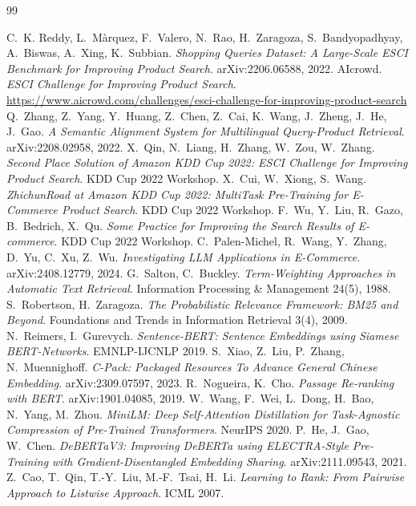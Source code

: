 \documentclass[12pt,a4paper]{report}
\begin{document}
\renewcommand{\bibname}{References}
\begin{thebibliography}{99}\small
{}
 C.~K. Reddy, L.~M\`arquez, F.~Valero, N.~Rao, H.~Zaragoza, S.~Bandyopadhyay, A.~Biswas, A.~Xing, K.~Subbian. \emph{Shopping Queries Dataset: A Large-Scale ESCI Benchmark for Improving Product Search}. arXiv:2206.06588, 2022.
 AIcrowd. \emph{ESCI Challenge for Improving Product Search}. \url{https://www.aicrowd.com/challenges/esci-challenge-for-improving-product-search}
 Q.~Zhang, Z.~Yang, Y.~Huang, Z.~Chen, Z.~Cai, K.~Wang, J.~Zheng, J.~He, J.~Gao. \emph{A Semantic Alignment System for Multilingual Query-Product Retrieval}. arXiv:2208.02958, 2022.
 X.~Qin, N.~Liang, H.~Zhang, W.~Zou, W.~Zhang. \emph{Second Place Solution of Amazon KDD Cup 2022: ESCI Challenge for Improving Product Search}. KDD Cup 2022 Workshop.
 X.~Cui, W.~Xiong, S.~Wang. \emph{ZhichunRoad at Amazon KDD Cup 2022: MultiTask Pre-Training for E-Commerce Product Search}. KDD Cup 2022 Workshop.
 F.~Wu, Y.~Liu, R.~Gazo, B.~Bedrich, X.~Qu. \emph{Some Practice for Improving the Search Results of E-commerce}. KDD Cup 2022 Workshop.
 C.~Palen-Michel, R.~Wang, Y.~Zhang, D.~Yu, C.~Xu, Z.~Wu. \emph{Investigating LLM Applications in E-Commerce}. arXiv:2408.12779, 2024.
 G.~Salton, C.~Buckley. \emph{Term-Weighting Approaches in Automatic Text Retrieval}. Information Processing \& Management 24(5), 1988.
 S.~Robertson, H.~Zaragoza. \emph{The Probabilistic Relevance Framework: BM25 and Beyond}. Foundations and Trends in Information Retrieval 3(4), 2009.
 N.~Reimers, I.~Gurevych. \emph{Sentence-BERT: Sentence Embeddings using Siamese BERT-Networks}. EMNLP-IJCNLP 2019.
 S.~Xiao, Z.~Liu, P.~Zhang, N.~Muennighoff. \emph{C-Pack: Packaged Resources To Advance General Chinese Embedding}. arXiv:2309.07597, 2023.
 R.~Nogueira, K.~Cho. \emph{Passage Re-ranking with BERT}. arXiv:1901.04085, 2019.
 W.~Wang, F.~Wei, L.~Dong, H.~Bao, N.~Yang, M.~Zhou. \emph{MiniLM: Deep Self-Attention Distillation for Task-Agnostic Compression of Pre-Trained Transformers}. NeurIPS 2020.
 P.~He, J.~Gao, W.~Chen. \emph{DeBERTaV3: Improving DeBERTa using ELECTRA-Style Pre-Training with Gradient-Disentangled Embedding Sharing}. arXiv:2111.09543, 2021.
 Z.~Cao, T.~Qin, T.-Y.~Liu, M.-F.~Tsai, H.~Li. \emph{Learning to Rank: From Pairwise Approach to Listwise Approach}. ICML 2007.

\end{thebibliography}
\end{document}

